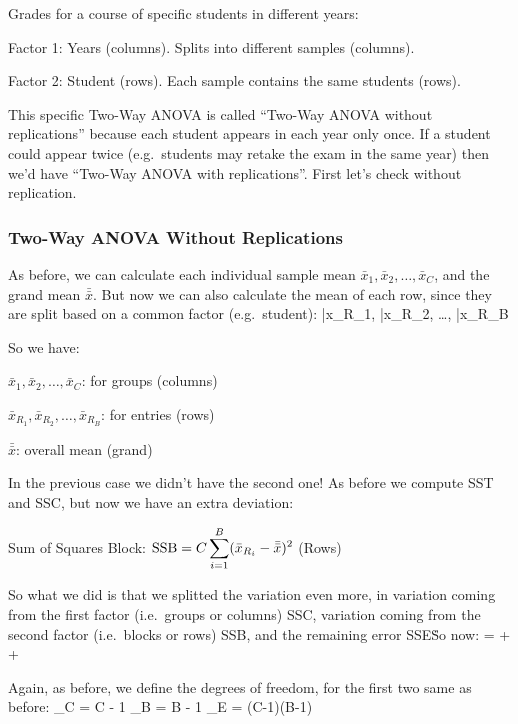 \be
Grades for a course of specific students in different years:
\bit
\item Factor 1: Years (columns). Splits into different samples (columns).
\item Factor 2: Student (rows). Each sample contains the same students (rows).
\eit
\ee

This specific Two-Way ANOVA is called ``Two-Way ANOVA without replications'' because each student appears in each
year only once. If a student could appear twice (e.g.\ students may retake the exam in the same year) then we'd
have ``Two-Way ANOVA with replications''. First let's check without replication.

\subsubsection{Two-Way ANOVA Without Replications}

As before, we can calculate each individual sample mean $\bar{x}_{1}, \bar{x}_{2}, \ldots, \bar{x}_{C}$, and the
grand mean $\bar{\bar{x}}$. But now we can also calculate the mean of each row, since they are split based on a
common factor (e.g.\ student):
\bse
\bar{x}_{R_{1}}, \: \bar{x}_{R_{2}}, \: \ldots, \: \bar{x}_{R_{B}}
\ese

So we have:

\bit
\item $\bar{x}_{1}, \bar{x}_{2}, \ldots, \bar{x}_{C}$: for groups (columns)
\item $\bar{x}_{R_{1}}, \bar{x}_{R_{2}}, \ldots, \bar{x}_{R_{B}}$: for entries (rows)
\item $\bar{\bar{x}}$: overall mean (grand)
\eit

In the previous case we didn't have the second one! As before we compute SST and SSC, but now we have an extra
deviation:

\bit
\item Sum of Squares Block: $\displaystyle \text{SSB} = C \sum_{i=1}^{B} (\bar{x}_{R_{i}} - \bar{\bar{x}})^{2}$ \:\: (Rows)
\eit

So what we did is that we splitted the variation even more, in variation coming from the first factor (i.e.\ groups
or columns) SSC, variation coming from the second factor (i.e.\ blocks or rows) SSB, and the remaining error SSE\.
So now:
\bse
{} =  +  + 
\ese

Again, as before, we define the degrees of freedom, for the first two same as before:
\bse
{}_{C} = C - 1 \qquad \qquad {}_{B} = B - 1 \qquad \qquad {}_{E} = (C-1)(B-1)
\ese

